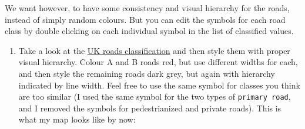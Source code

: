 \documentclass[
  letterpaper,
  DIV=11,
  numbers=noendperiod]{scrreprt}
\providecommand{\tightlist}{%
  \setlength{\itemsep}{0pt}\setlength{\parskip}{0pt}}\usepackage{longtable,booktabs,array}
\begin{document}
We want however, to have some consistency and visual hierarchy for the
roads, instead of simply random colours. But you can edit the symbols
for each road class by double clicking on each individual symbol in the
list of classified values.

\begin{enumerate}
\def\labelenumi{(\arabic{enumi})}
\setcounter{enumi}{209}
\tightlist
\item
  Take a look at the
  \href{https://www.gov.uk/government/publications/guidance-on-road-classification-and-the-primary-route-network/guidance-on-road-classification-and-the-primary-route-network}{UK
  roads classification} and then style them with proper visual
  hierarchy. Colour A and B roads red, but use different widths for
  each, and then style the remaining roads dark grey, but again with
  hierarchy indicated by line width. Feel free to use the same symbol
  for classes you think are too similar (I used the same symbol for the
  two types of \texttt{primary\ road}, and I removed the symbols for
  pedestrianized and private roads). This is what my map looks like by
  now:
\end{enumerate}
\end{document}
